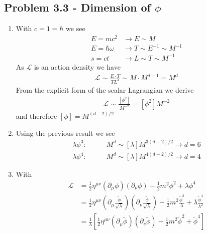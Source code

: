 \documentclass[10pt,a4paper]{book}
\theoremstyle{definition}
\begin{document}
\subsection{Problem 3.3 - Dimension of \texorpdfstring{$\phi$}{TEXT}}
\begin{enumerate}
    \item With $c=1=\hbar$ we see
    \begin{align}
        E=mc^2        &\rightarrow E\sim M\\
        E=\hbar\omega &\rightarrow T\sim E^{-1}\sim M^{-1}\\
        s=ct          &\rightarrow L\sim T\sim M^{-1}
    \end{align}
    As $\mathscr{L}$ is an action density we have
    \begin{align}
        \mathscr{L}\sim \frac{E\cdot T}{TL^3}\sim M\cdot M^{d-1}=M^d
    \end{align}
    From the explicit form of the scalar Lagrangian we derive
    \begin{align}
        \mathscr{L}\sim \frac{[\phi^2]}{M^{-2}}=[\phi^2]M^{-2}
    \end{align}
    and therefore $[\phi]=M^{(d-2)/2}$
    
    \item Using the previous result we see
    \begin{align}
        \lambda\phi^3: &\qquad M^d \sim [\lambda] M^{3(d-2)/2}\rightarrow d=6\\
        \lambda\phi^4: &\qquad M^d \sim [\lambda] M^{4(d-2)/2}\rightarrow d=4
    \end{align}
    
    \item With
    \begin{align}
        \mathscr{L}
        &=\frac{1}{2}\eta^{\mu\nu}(\partial_\mu\phi)(\partial_\nu\phi)-\frac{1}{2}m^2\phi^2+\lambda\phi^4\\
        &=\frac{1}{2}\eta^{\mu\nu}\left(\partial_\mu\frac{\tilde\phi}{\sqrt{\lambda}}\right)\left(\partial_\nu\frac{\tilde\phi}{\sqrt{\lambda}}\right)-\frac{1}{2}m^2\frac{\tilde\phi^2}{\lambda}+\lambda\frac{\tilde\phi^4}{\lambda^2}\\
        &=\frac{1}{\lambda}\left[\frac{1}{2}\eta^{\mu\nu}(\partial_\mu\tilde\phi)(\partial_\nu\tilde\phi)-\frac{1}{2}m^2\tilde\phi^2+\tilde\phi^4\right]
    \end{align}
\end{enumerate}
\end{document}
